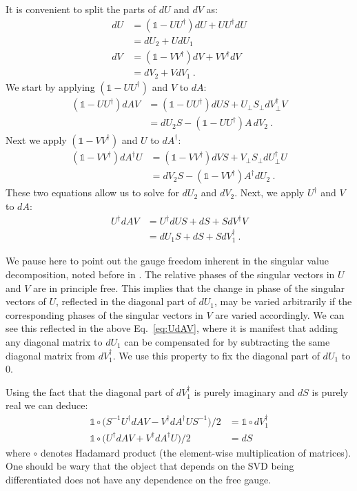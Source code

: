 \documentclass[twocolumn,floatfix,superscriptaddress,longbibliography,pra]{revtex4-2}
\begin{document}
It is convenient to split the parts of $dU$ and $dV$ as:
\begin{align}
    dU&=(\mathbb{1}-U U^\dagger)dU + U U^\dagger dU\\
    &=dU_2 + U dU_1\\
    dV&=(\mathbb{1}-V V^\dagger)dV + V V^\dagger dV\\
    &=dV_2 + V dV_1\label{eq:dV2}\ .
\end{align}
We start by applying $(\mathbb{1}-UU^\dagger)$ and $V$ to $dA$:
\begin{align}
    (\mathbb{1}-U U^\dagger) dAV&=(\mathbb{1}-U U^\dagger) dUS +  U_\perp S_\perp dV^\dagger_\perp V\\
    &=dU_2S - (\mathbb{1}-U U^\dagger)A\,dV_2\label{eq:dU2}\ .
\end{align}
Next we apply $(\mathbb{1}-V V^\dagger)$ and $U$ to $dA^\dagger$:
\begin{align}
    (\mathbb{1}-V V^\dagger) dA^\dagger U&=(\mathbb{1}-V V^\dagger) dVS +  V_\perp S_\perp dU^\dagger_\perp U\\
    &=dV_2S - (\mathbb{1}-V V^\dagger)A^\dagger dU_2\ .
\end{align}
These two equations allow us to solve for $dU_2$ and $dV_2$. 
Next, we apply $U^\dagger$ and $V$ to $dA$:
\begin{align}
    U^\dagger dAV&=U^\dagger dUS +  dS + SdV^\dagger V \\
    &=dU_1 S + dS + S dV_1^\dagger\ .
    \label{eq:UdAV}
\end{align}

We pause here to point out the gauge freedom inherent in the singular value decomposition, noted before in \cite{complexSVD}. The relative phases of the singular vectors in $U$ and $V$ are in principle free. This implies that the change in phase of the singular vectors of $U$, reflected in the diagonal part of $dU_1$, may be varied arbitrarily if the corresponding phases of the singular vectors in $V$ are varied accordingly. We can see this reflected in the above Eq.~\eqref{eq:UdAV}, where it is manifest that adding any diagonal matrix to $dU_1$ can be compensated for by subtracting the same diagonal matrix from $dV_1^\dagger$. We use this property to fix the diagonal part of $dU_1$ to $0$.

Using the fact that the diagonal part of $dV_1^\dagger$ is purely imaginary and $dS$ is purely real we can deduce:
\begin{align}
    \mathbb{1}\circ\big(S^{-1}U^\dagger dAV-V^\dagger dA^\dagger US^{-1}\big)/2&=\mathbb{1}\circ dV_1^\dagger\\
    \mathbb{1}\circ\big(U^\dagger dAV+V^\dagger dA^\dagger U\big)/2&=dS\label{eq:dS}
\end{align}
where $\circ$ denotes Hadamard product (the element-wise multiplication of matrices). One should be wary  that the object that depends on the SVD being differentiated does not have any dependence on the free gauge. 
\end{document}
